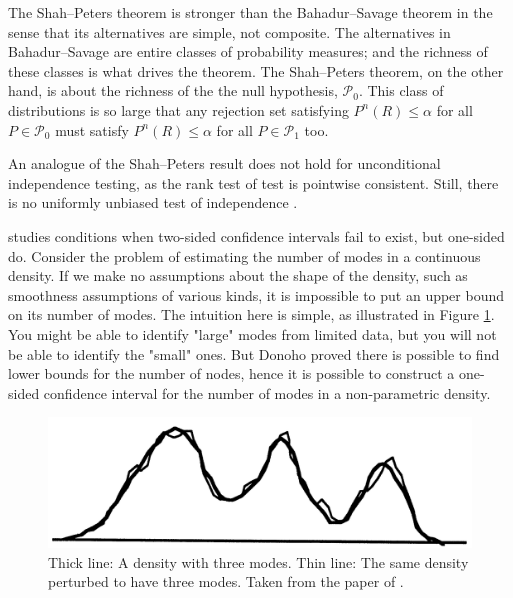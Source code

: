 The Shah--Peters theorem is stronger than the Bahadur--Savage theorem in the sense that its alternatives are simple, not composite. The alternatives in Bahadur--Savage are entire classes of probability measures; and the richness of these classes is what drives the theorem. The Shah--Peters theorem, on the other hand, is about the richness of the the null hypothesis, $\mathcal{P}_{0}$. This class of distributions is so large that any rejection set satisfying $P^{n}(R)\leq\alpha$ for all $P\in\mathcal{P}_{0}$ must satisfy $P^{n}(R)\leq\alpha$ for all $P\in\mathcal{P}_{1}$ too.

An analogue of the Shah--Peters result does not hold for unconditional independence testing, as the rank test of \textcite{Hoeffding1948-nm} test is pointwise consistent. Still, there is no uniformly unbiased test of independence \parencite{Moss2020-bc}.

\textcite{Donoho1988-hg} studies conditions when two-sided confidence intervals fail to exist, but one-sided do. Consider the problem of estimating the number of modes in a continuous density. If we make no assumptions about the shape of the density, such as smoothness assumptions of various kinds, it is impossible to put an upper bound on its number of modes. The intuition here is simple, as illustrated in Figure \ref{fig:donoho}. You might be able to identify "large" modes from limited data, but you will not be able to identify the "small" ones. But Donoho proved there is possible to find lower bounds for the number of nodes, hence it is possible to construct a one-sided confidence interval for the number of modes in a non-parametric density.

\begin{figure}
    \centering
    \includegraphics[scale=0.16]{figures/donoho.png}
    \caption{Thick line: A density with three modes. Thin line: The same density perturbed to have three modes. Taken from the paper of \textcite{Donoho1988-hg}.}
    \label{fig:donoho}
\end{figure}

